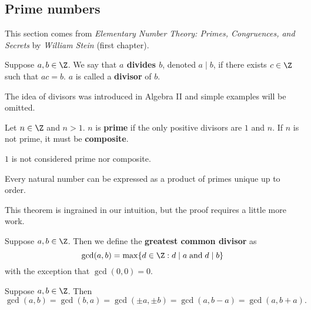 \subsection{Prime numbers}

This section comes from \emph{
	Elementary Number Theory: Primes, Congruences, and Secrets
} by \emph{William Stein} (first chapter).

\begin{definition}[Divides]
	Suppose $a,b \in \Z$.
	We say that \textbf{$a$ divides $b$}, 
	denoted $a \mid b$,
	if there exists $c \in \Z$ such that $ac = b$.
	$a$ is called a \textbf{divisor} of $b$. 
\end{definition}

\begin{remark}
	The idea of divisors was introduced in Algebra II and simple examples
	will be omitted.
\end{remark}

\begin{definition}
	Let $n \in \Z$ and $n > 1$.
	$n$ is \textbf{prime} if the only positive divisors are $1$ and $n$. 
	If $n$ is not prime, it must be \textbf{composite}.
\end{definition}

\begin{remark}
	$1$ is not considered prime nor composite.
\end{remark}

\begin{theorem}
	Every natural number can be expressed as a product of primes unique up to 
	order.
\end{theorem}

\begin{remark}
	This theorem is ingrained in our intuition, but the proof requires a little
	more work.
\end{remark}

\begin{definition}
	Suppose $a, b \in \Z$.
	Then we define the \textbf{greatest common divisor} as \[
		\gcd(a,b) = \max \{ d \in \Z: d \mid a \;\text{and}\; d \mid b \}
	\] with the exception that $\gcd(0,0) = 0$.
\end{definition}

\begin{lemma}[]
	\label{lem:gcd-lem-1}
	Suppose $a, b \in \Z$. Then
	\[
		\gcd(a, b)
		= \gcd(b, a)
		= \gcd(\pm a, \pm b)
		= \gcd(a, b - a)
		= \gcd(a, b + a).
	\]
\end{lemma}


